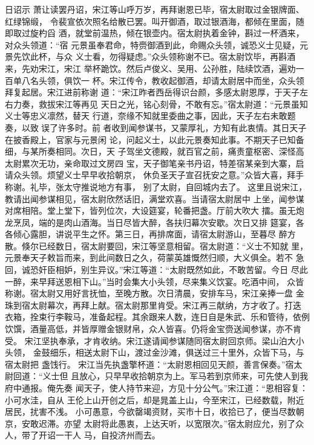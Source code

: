 日诏示
萧让读罢丹诏，宋江等山呼万岁，再拜谢恩已毕，宿太尉取过金银牌面、红绿锦缎，
令裴宣依次照名给散已罢。叫开御酒，取过银酒海，都倾在里面，随即取过旋杓舀
酒，就堂前温热，倾在银壶内。宿太尉执着金钟，斟过一杯酒来，对众头领道：“宿
元景虽奉君命，特赍御酒到此，命赐众头领，诚恐义士见疑，元景先饮此杯，与众
义士看，勿得疑虑。”众头领称谢不已。宿太尉饮毕，再斟酒来，先劝宋江，宋江
举杯跪饮。然后卢俊义、吴用、公孙胜，陆续饮酒，遍劝一百单八名头领，俱饮一
杯。宋江传令，教收起御酒，却请太尉居中而坐，众头领拜复起居。宋江进前称谢
道：“宋江昨者西岳得识台颜，多感太尉恩厚，于天子左右力奏，救拔宋江等再见
天日之光，铭心刻骨，不敢有忘。”宿太尉道：“元景虽知义士等忠义凛然，替天
行道，奈缘不知就里委曲之事，因此，天子左右未敢题奏，以致误了许多时。前
者收到闻参谋书，又蒙厚礼，方知有此衷情。其日天子在披香殿上，官家与元景闲
论，问起义士，以此元景奏知此事。不期天子已知备细，与某所奏相同。次日，天
子驾坐文德殿，就百官之前，痛责童枢密、深怪高太尉累次无功，亲命取过文房四
宝，天子御笔亲书丹诏，特差宿某亲到大寨，启请众头领。烦望义士早早收拾朝京，
休负圣天子宣召抚安之意。”众皆大喜，拜手称谢。礼毕，张太守推说地方有事，
别了太尉，自回城内去了。
这里且说宋江，教请出闻参谋相见，宿太尉欣然话旧，满堂欢喜。当请宿太尉居中
上坐，闻参谋对席相陪。堂上堂下，皆列位次，大设筵宴，轮番把盏。厅前大吹大
擂。虽无炮龙烹凤，端的是肉山酒海。当日尽皆大醉，各扶归幕次安歇。次日又排
筵宴，各各倾心露胆，讲说平生之怀。第三日，再排席面，请宿太尉游山，至暮尽
醉方散。倏尔已经数日，宿太尉要回，宋江等坚意相留。宿太尉道：“义士不知就
里，元景奉天子敕旨而来，到此间数日之久，荷蒙英雄慨然归顺，大义俱全。若不
急回，诚恐奸臣相妒，别生异议。”宋江等道：“太尉既然如此，不敢苦留。今日
尽此一醉，来早拜送恩相下山。”当时会集大小头领，尽来集义饮宴。吃酒中间，
众皆称谢。宿太尉又用好言抚恤，至晚方散。次日清晨，安排车马，宋江亲捧一盘
金珠到宿太尉幕次，再拜上献。宿太尉那里肯受。宋江再三献纳，方才收了。打迭
衣箱，拴束行李鞍马，准备起程。其余跟来人数，连日自是朱武、乐和管待，依例
饮馔，酒量高低，并皆厚赠金银财帛，众人皆喜。仍将金宝赍送闻参谋，亦不肯受。
宋江坚执奉承，才肯收纳。宋江遂请闻参谋随同宿太尉回京师。梁山泊大小头领，
金鼓细乐，相送太尉下山，渡过金沙滩，俱送过三十里外，众皆下马，与宿太尉把
盏饯行。
宋江当先执盏擎杯道：“太尉恩相回见天颜，善言保奏。”宿太尉回道：“义士但
且放心，只早早收拾朝京为上。军马若到京师来，可先使人到我府中通报。俺先奏
闻天子，使人持节来迎，方见十分公气。”宋江道：“恩相容复：小可水洼，自从
王伦上山开创之后，却是晁盖上山，今至宋江，已经数载，附近居民，扰害不浅。
小可愚意，今欲罄竭资财，买市十日，收拾已了，便当尽数朝京，安敢迟滞。亦望
太尉将此愚衷，上达天听，以宽限次。”宿太尉应允，别了众人，带了开诏一干人
马，自投济州而去。
